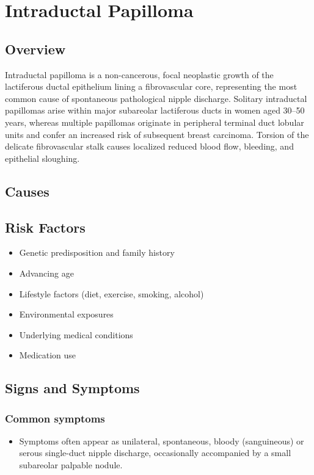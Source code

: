 \chapter{Intraductal Papilloma}
\label{sec:Intraductal Papilloma}

\section{Overview}
Intraductal papilloma is a non-cancerous, focal neoplastic growth of the lactiferous ductal epithelium lining a fibrovascular core, representing the most common cause of spontaneous pathological nipple discharge. Solitary intraductal papillomas arise within major subareolar lactiferous ducts in women aged 30--50 years, whereas multiple papillomas originate in peripheral terminal duct lobular units and confer an increased risk of subsequent breast carcinoma. Torsion of the delicate fibrovascular stalk causes localized reduced blood flow, bleeding, and epithelial sloughing.
\section{Causes}
\section{Risk Factors}

\begin{itemize}[noitemsep]
  \item Genetic predisposition and family history
  \item Advancing age
  \item Lifestyle factors (diet, exercise, smoking, alcohol)
  \item Environmental exposures
  \item Underlying medical conditions
  \item Medication use
\end{itemize}
\section{Signs and Symptoms}

\subsection{Common symptoms}
\begin{itemize}[noitemsep]
  \item Symptoms often appear as unilateral, spontaneous, bloody (sanguineous) or serous single-duct nipple discharge, occasionally accompanied by a small subareolar palpable nodule. 
  \end{itemize}

